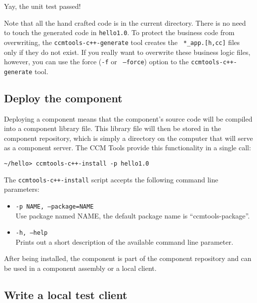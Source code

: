 Yay, the unit test passed!

Note that all the hand crafted code is in the current directory. There is no
need to touch the generated code in {\tt hello1.0}. To protect the business code
from overwriting, the {\tt ccmtools-c++-generate} tool creates the {\tt
*\_app.[h,cc]} files only if they do not exist. If you really want to overwrite
these business logic files, however, you can use the force ({\tt -f} or {\tt
--force}) option to the {\tt ccmtools-c++-generate} tool.

\subsection{Deploy the component}

Deploying a component means that the component's source code will be compiled
into a component library file. This library file will then be stored in the
component repository, which is simply a directory on the computer that will
serve as a component server. The CCM Tools provide this functionality in a
single call:
\begin{small}
\begin{verbatim}
~/hello> ccmtools-c++-install -p hello1.0
\end{verbatim}
\end{small}

The {\tt ccmtools-c++-install} script accepts the following command line
parameters:
\begin{itemize}
\item {\tt -p NAME, --package=NAME}\\
Use package named NAME, the default package name is ``ccmtools-package''.

\item {\tt -h, --help}\\
Prints out a short description of the available command line parameter.
\end{itemize}

After being installed, the component is part of the component repository and can
be used in a component assembly or a local client.

\subsection{Write a local test client}

